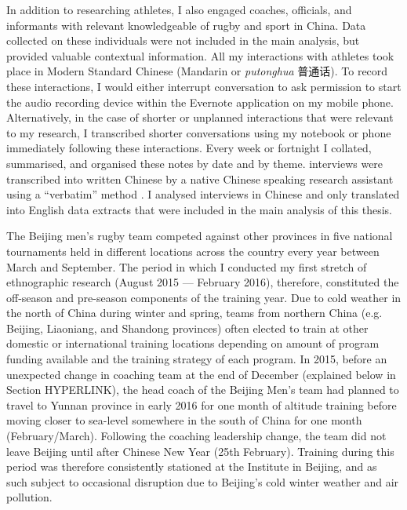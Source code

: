 \begin{CJK}{UTF8}{gbsn}
In addition to researching athletes, I also engaged coaches, officials, and informants with relevant knowledgeable of rugby and sport in China. Data collected on these individuals were not included in the main analysis, but provided valuable contextual information.
All my interactions with athletes took place in Modern Standard Chinese (Mandarin or \textit{putonghua} 普通话).  To record these interactions, I would either interrupt conversation to ask permission to start the audio recording device within the Evernote application on my mobile phone.  Alternatively, in the case of shorter or unplanned interactions that were relevant to my research,  I transcribed shorter conversations using my notebook or phone immediately following these interactions.  Every week or fortnight I collated, summarised, and organised these notes by date and by theme.  interviews were transcribed into written Chinese by a native Chinese speaking research assistant using a ``verbatim'' method \citep[i.e., including an account of all verbal and important nonverbal (coughs, pauses, etc.) utterances, see][269-70]{Poland2003}.  I analysed interviews in Chinese and only translated into English data extracts that were included in the main analysis of this thesis.

The Beijing men's rugby team competed against other provinces in five national tournaments held in different locations across the country every year between March and September.  The period in which I conducted my first stretch of ethnographic research (August 2015 --- February 2016), therefore, constituted the off-season and pre-season components of the training year.  Due to cold weather in the north of China during winter and spring, teams from northern China (e.g. Beijing, Liaoniang, and Shandong provinces) often elected to train at other domestic or international training locations depending on amount of program funding available and the training strategy of each program.  In 2015, before an unexpected change in coaching team at the end of December (explained below in Section HYPERLINK), the head coach of the Beijing Men's team had planned to travel to Yunnan province in early 2016 for one month of altitude training before moving closer to sea-level somewhere in the south of China for one month (February/March).  Following the coaching leadership change, the team did not leave Beijing until after Chinese New Year (25th February). Training during this period was therefore consistently stationed at the Institute in Beijing, and as such subject to occasional disruption due to Beijing's cold winter weather and air pollution.


\end{CJK}

